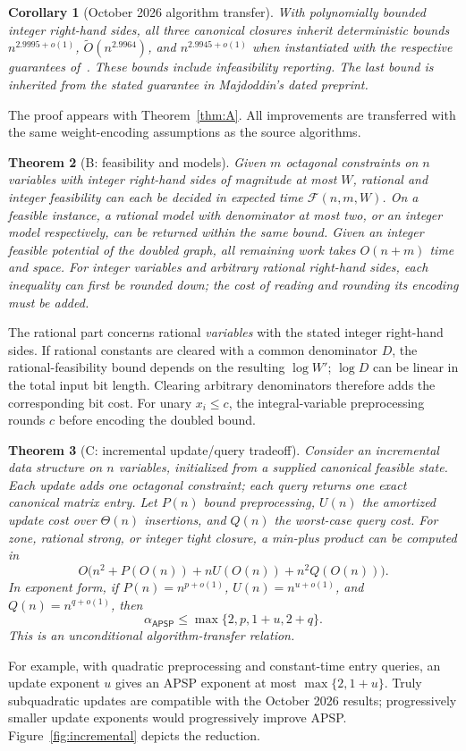 \documentclass[manuscript,11pt,screen,nonacm]{acmart}
\newtheorem{theorem}{Theorem}[section]
\newtheorem{corollary}[theorem]{Corollary}
\theoremstyle{definition}
\newcommand{\AP}{\mathsf{APSP}}
\newcommand{\Ftime}{\mathcal F(n,m,W)}
\begin{document}
\begin{corollary}[October 2026 algorithm transfer]\label{cor:2026}
With polynomially bounded integer right-hand sides, all three canonical closures inherit deterministic bounds $n^{2.9995+o(1)}$, $\widetilde O(n^{2.9964})$, and $n^{2.9945+o(1)}$ when instantiated with the respective guarantees of~\cite{alman2026,saha2026,majdoddin2026}. These bounds include infeasibility reporting. The last bound is inherited from the stated guarantee in Majdoddin's dated preprint.
\end{corollary}
The proof appears with Theorem~\ref{thm:A}. All improvements are transferred with the same weight-encoding assumptions as the source algorithms.

\begin{theorem}[B: feasibility and models]\label{thm:B}
Given $m$ octagonal constraints on $n$ variables with integer right-hand sides of magnitude at most $W$, rational and integer feasibility can each be decided in expected time $\Ftime$. On a feasible instance, a rational model with denominator at most two, or an integer model respectively, can be returned within the same bound. Given an integer feasible potential of the doubled graph, all remaining work takes $O(n+m)$ time and space. For integer variables and arbitrary rational right-hand sides, each inequality can first be rounded down; the cost of reading and rounding its encoding must be added.
\end{theorem}
The rational part concerns rational \emph{variables} with the stated integer right-hand sides. If rational constants are cleared with a common denominator $D$, the rational-feasibility bound depends on the resulting $\log W'$; $\log D$ can be linear in the total input bit length. Clearing arbitrary denominators therefore adds the corresponding bit cost. For unary $x_i\leq c$, the integral-variable preprocessing rounds $c$ before encoding the doubled bound.

\begin{theorem}[C: incremental update/query tradeoff]\label{thm:C}
Consider an incremental data structure on $n$ variables, initialized from a supplied canonical feasible state. Each update adds one octagonal constraint; each query returns one exact canonical matrix entry. Let $P(n)$ bound preprocessing, $U(n)$ the amortized update cost over $\Theta(n)$ insertions, and $Q(n)$ the worst-case query cost. For zone, rational strong, or integer tight closure, a min-plus product can be computed in
\[
 O\bigl(n^2+P(O(n))+nU(O(n))+n^2Q(O(n))\bigr).
\]
In exponent form, if $P(n)=n^{p+o(1)}$, $U(n)=n^{u+o(1)}$, and $Q(n)=n^{q+o(1)}$, then
\begin{equation}\label{eq:tradeoff}
 \alpha_{\AP}\leq\max\{2,p,1+u,2+q\}.
\end{equation}
This is an unconditional algorithm-transfer relation.
\end{theorem}
For example, with quadratic preprocessing and constant-time entry queries, an update exponent $u$ gives an APSP exponent at most $\max\{2,1+u\}$. Truly subquadratic updates are compatible with the October 2026 results; progressively smaller update exponents would progressively improve APSP. Figure~\ref{fig:incremental} depicts the reduction.
\end{document}
